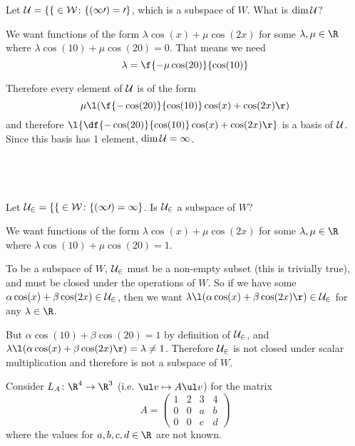 \documentclass[a4paper]{article}
\begin{document}
\begin{questionbody}
Let $\cal U = \{ f \in W \colon f(10) = 0 \}$, which is a subspace of $W$. What is $\dim \cal U$?
\end{questionbody}

We want functions of the form $\lambda \cos(x) + \mu \cos(2x)$ for some $\lambda, \mu \in \R$ where $\lambda \cos(10) + \mu \cos(20) = 0$. That means we need \[ \lambda = \f{-\mu \cos(20)}{\cos(10)} \]

Therefore every element of $\cal U$ is of the form \[
\mu \l(\f{-\cos(20)}{\cos(10)} \cos(x) + \cos(2x) \r)
\] and therefore $\l\{ \df{-\cos(20)}{\cos(10)} \cos(x) + \cos(2x) \r\}$ is a basis of $\cal U$. Since this basis has 1 element, $\dim \cal U = 1$.

\subsection{~} %

\begin{questionbody}
Let $\cal U_2 = \{ f \in W \colon f(10) = 1 \}$. Is $\cal U_2$ a subspace of $W$?
\end{questionbody}

We want functions of the form $\lambda \cos(x) + \mu \cos(2x)$ for some $\lambda, \mu \in \R$ where $\lambda \cos(10) + \mu \cos(20) = 1$.

To be a subspace of $W$, $\cal U_2$ must be a non-empty subset (this is trivially true), and must be closed under the operations of $W$. So if we have some $\alpha \cos(x) + \beta \cos(2x) \in \cal U_2$, then we want $\lambda \l( \alpha \cos(x) + \beta \cos(2x) \r) \in \cal U_2$ for any $\lambda \in \R$.

But $\alpha \cos(10) + \beta \cos(20) = 1$ by definition of $\cal U_2$, and $\lambda \l( \alpha \cos(x) + \beta \cos(2x) \r) = \lambda \ne 1$. Therefore $\cal U_2$ is not closed under scalar multiplication and therefore is not a subspace of $W$.



\begin{questionbody}
Consider $L_A \colon \R^4 \to \R^3$ (i.e. $\ul v \mapsto A \ul v$) for the matrix \[
A = \begin{pmatrix} 1 & 2 & 3 & 4 \\ 0 & 0 & a & b \\ 0 & 0 & c & d \end{pmatrix}
\] where the values for $a, b, c, d \in \R$ are not known.
\end{questionbody}
\end{document}
